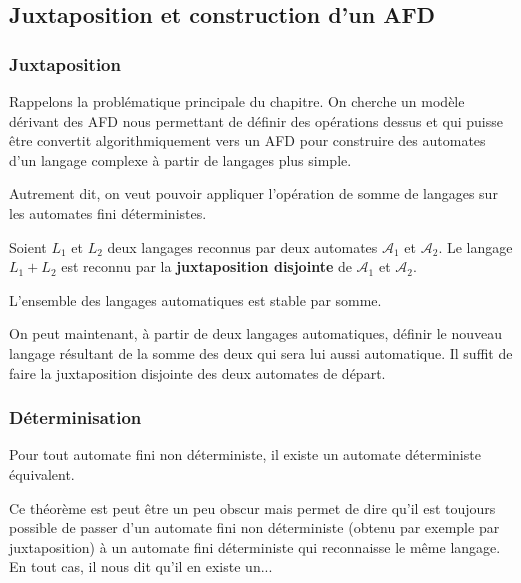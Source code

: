 \subsection{Juxtaposition et construction d'un AFD}

\subsubsection{Juxtaposition}

Rappelons la problématique principale du chapitre. On cherche un modèle dérivant des AFD nous permettant de définir 
des opérations dessus et qui puisse être convertit algorithmiquement vers un AFD pour construire des automates 
d'un langage complexe à partir de langages plus simple. 

Autrement dit, on veut pouvoir appliquer l'opération de somme de langages sur les automates fini déterministes. 

\begin{definition}
    Soient $L_1$ et $L_2$ deux langages reconnus par deux automates $ \mathcal{A}_1$ et $ \mathcal{A}_2$. 
    Le langage $L_1 + L_2$ est reconnu par la \textbf{juxtaposition disjointe} de $ \mathcal{A}_1$ et $ \mathcal{A}_2$. 
\end{definition}

\begin{theorem}
    L'ensemble des langages automatiques est stable par somme. 
\end{theorem}

On peut maintenant, à partir de deux langages automatiques, définir le nouveau langage résultant de 
la somme des deux qui sera lui aussi automatique. Il suffit de faire la juxtaposition disjointe des deux automates
de départ. 

\subsubsection{Déterminisation}

\begin{theorem}
    Pour tout automate fini non déterministe, il existe un automate déterministe équivalent. 
\end{theorem}

Ce théorème est peut être un peu obscur mais permet de dire qu'il est toujours possible de passer d'un 
automate fini non déterministe (obtenu par exemple par juxtaposition) à un automate fini déterministe
qui reconnaisse le même langage. En tout cas, il nous dit qu'il en existe un...


